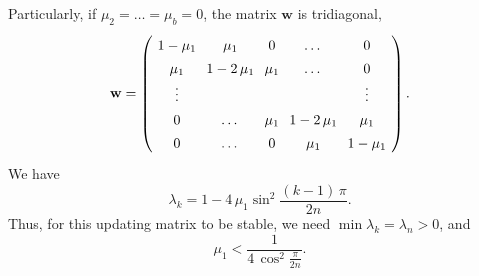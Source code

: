 \documentclass[reprint]{revtex4-1}
\begin{document}
Particularly, if $\mu_2 = \dots = \mu_b = 0$,
the matrix $\mathbf w$ is tridiagonal,
%
\begin{equation}
\arraycolsep=3.6pt\def\arraystretch{1.4}
\mathbf w
=
\left(
  \begin{array}{cccccccc}
    1 - \mu_1   & \mu_1 & 0 & \dots & 0 \\
    \mu_1 & 1 - 2 \, \mu_1  & \mu_1 & \dots & 0 \\
    \vdots & &  & & \vdots \\
    0 & \dots & \mu_1 & 1 - 2 \, \mu_1  & \mu_1 \\
    0 & \dots & 0 & \mu_1 & 1 - \mu_1
  \end{array}
\right).
\label{eq:wtridiag}
\end{equation}
%
We have
\begin{equation}
  \lambda_k = 1 - 4 \, \mu_1 \sin^2 \frac{(k - 1) \, \pi}{2n}.
\label{eq:wtridiag_eigenvalue}
\end{equation}
%
Thus, for this updating matrix to be stable,
we need
$\min \lambda_k = \lambda_n > 0$,
and
$$
\mu_1 < \frac{1}{4 \, \cos^2\frac{\pi}{2n} }.
$$
\end{document}
